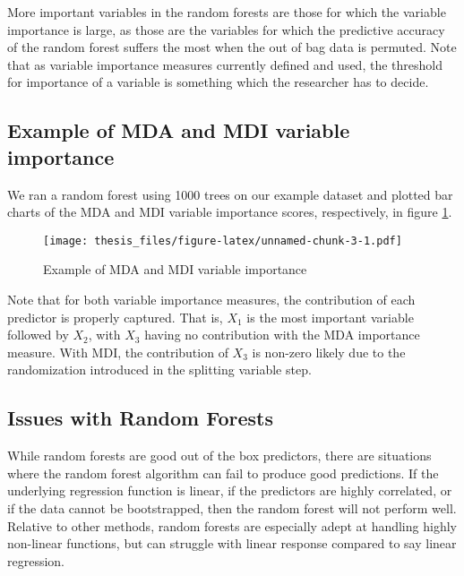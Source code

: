 \documentclass[12pt,twoside]{reedthesis}
\theoremstyle{definition}
\theoremstyle{definition}
\theoremstyle{definition}
\theoremstyle{remark}
\begin{document}
More important variables in the random forests are those for which the
variable importance is large, as those are the variables for which the
predictive accuracy of the random forest suffers the most when the out
of bag data is permuted. Note that as variable importance measures
currently defined and used, the threshold for importance of a variable
is something which the researcher has to decide. \par

\subsection{Example of MDA and MDI variable
importance}\label{example-of-mda-and-mdi-variable-importance}

We ran a random forest using 1000 trees on our example dataset and
plotted bar charts of the MDA and MDI variable importance scores,
respectively, in figure \ref{mda_ex}. \par
\begin{figure}
\centering
\texttt{[image: thesis\_files/figure-latex/unnamed-chunk-3-1.pdf]}
\caption{\label{fig:unnamed-chunk-3}\label{mda_ex}Example of MDA and MDI
variable importance}
\end{figure}
Note that for both variable importance measures, the contribution of
each predictor is properly captured. That is, \(X_1\) is the most
important variable followed by \(X_2\), with \(X_3\) having no
contribution with the MDA importance measure. With MDI, the contribution
of \(X_3\) is non-zero likely due to the randomization introduced in the
splitting variable step.

\subsection{Issues with Random
Forests}\label{issues-with-random-forests}

While random forests are good out of the box predictors, there are
situations where the random forest algorithm can fail to produce good
predictions. If the underlying regression function is linear, if the
predictors are highly correlated, or if the data cannot be bootstrapped,
then the random forest will not perform well. Relative to other methods,
random forests are especially adept at handling highly non-linear
functions, but can struggle with linear response compared to say linear
regression. \par
\end{document}
